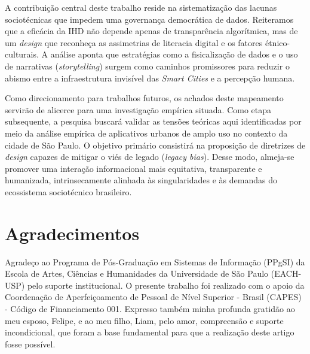 \documentclass[12pt]{article}
\begin{document}
A contribuição central deste trabalho reside na sistematização das lacunas sociotécnicas que impedem uma governança democrática de dados. Reiteramos que a eficácia da IHD não depende apenas de transparência algorítmica, mas de um \textit{design} que reconheça as assimetrias de literacia digital e os fatores étnico-culturais. A análise aponta que estratégias como a fisicalização de dados e o uso de narrativas (\textit{storytelling}) surgem como caminhos promissores para reduzir o abismo entre a infraestrutura invisível das \textit{Smart Cities} e a percepção humana.

Como direcionamento para trabalhos futuros, os achados deste mapeamento servirão de alicerce para uma investigação empírica situada. Como etapa subsequente, a pesquisa buscará validar as tensões teóricas aqui identificadas por meio da análise empírica de aplicativos urbanos de amplo uso no contexto da cidade de São Paulo. O objetivo primário consistirá na proposição de diretrizes de \textit{design} capazes de mitigar o viés de legado (\textit{legacy bias}). Desse modo, almeja-se promover uma interação informacional mais equitativa, transparente e humanizada, intrinsecamente alinhada às singularidades e às demandas do ecossistema sociotécnico brasileiro.


\section*{Agradecimentos}

Agradeço ao Programa de Pós-Graduação em Sistemas de Informação (PPgSI) da Escola de Artes, Ciências e Humanidades da Universidade de São Paulo (EACH-USP) pelo suporte institucional. O presente trabalho foi realizado com o apoio da Coordenação de Aperfeiçoamento de Pessoal de Nível Superior - Brasil (CAPES) - Código de Financiamento 001. Expresso também minha profunda gratidão ao meu esposo, Felipe, e ao meu filho, Liam, pelo amor, compreensão e suporte incondicional, que foram a base fundamental para que a realização deste artigo fosse possível.
\end{document}
